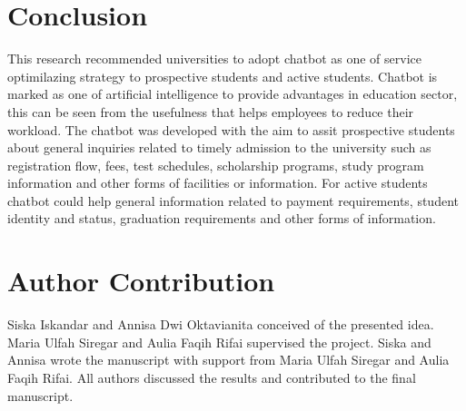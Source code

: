 \documentclass[conference]{IEEEtran}
\begin{document}
\section{Conclusion}
This research recommended universities to adopt chatbot as one of service optimilazing strategy to prospective students and active students. Chatbot is marked as one of artificial intelligence to provide advantages in education sector, this can be seen from the usefulness that helps employees to reduce their workload. The chatbot was developed with the aim to assit prospective students about general inquiries related to timely admission to the university such as registration flow, fees, test schedules, scholarship programs, study program information and other forms of facilities or information. For active students chatbot could help general information related to payment requirements, student identity and status, graduation requirements and other forms of information.

\section*{Author Contribution}
Siska Iskandar and Annisa Dwi Oktavianita conceived of the presented idea.
Maria Ulfah Siregar and Aulia Faqih Rifai supervised the project. 
Siska and Annisa wrote the manuscript with support from Maria Ulfah Siregar and Aulia Faqih Rifai. All authors discussed the results and contributed to the final manuscript.
\end{document}
